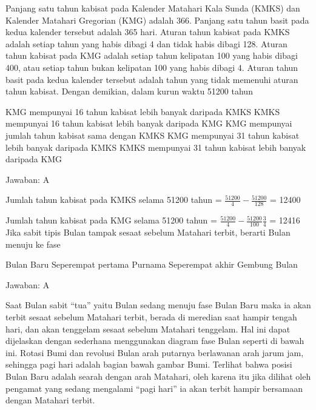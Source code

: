 \documentclass[11pt,fleqn]{exam}
\begin{document}
\begin{questions}
\question Panjang satu tahun kabisat pada Kalender Matahari Kala Sunda (KMKS) dan Kalender Matahari Gregorian (KMG) adalah 366. Panjang satu tahun basit pada kedua kalender tersebut adalah 365 hari. Aturan tahun kabisat pada KMKS adalah setiap tahun yang habis dibagi 4 dan tidak habis dibagi 128. Aturan tahun kabisat pada KMG adalah setiap tahun kelipatan 100 yang habis dibagi 400, atau setiap tahun bukan kelipatan 100 yang habis dibagi 4. Aturan tahun basit pada kedua kalender tersebut adalah tahun yang tidak memenuhi aturan tahun kabisat. Dengan demikian, dalam kurun waktu 51200 tahun
\begin{choices}
\choice KMG mempunyai 16 tahun kabisat lebih banyak daripada KMKS
\choice KMKS mempunyai 16 tahun kabisat lebih banyak daripada KMG
\choice KMG mempunyai jumlah tahun kabisat sama dengan KMKS
\choice KMG mempunyai 31 tahun kabisat lebih banyak daripada KMKS
\choice KMKS mempunyai 31 tahun kabisat lebih banyak daripada KMG
\end{choices}

Jawaban: A

Jumlah tahun kabisat pada KMKS selama 51200 tahun = $\frac{51200}{4}-\frac{51200}{128}$ = 12400

Jumlah tahun kabisat pada KMG selama 51200 tahun = $\frac{51200}{4}-\frac{51200}{100}\frac{3}{4}$ = 12416\\


\question Jika sabit tipis Bulan tampak sesaat sebelum Matahari terbit, berarti Bulan menuju ke fase
\begin{choices}
\choice Bulan Baru
\choice Seperempat pertama
\choice Purnama
\choice Seperempat akhir
\choice Gembung Bulan
\end{choices}

Jawaban: A

Saat Bulan sabit ``tua'' yaitu Bulan sedang menuju fase Bulan Baru maka ia akan terbit sesaat sebelum Matahari terbit, berada di meredian saat hampir tengah hari, dan akan tenggelam sesaat sebelum Matahari tenggelam. Hal ini dapat dijelaskan dengan sederhana menggunakan diagram fase Bulan seperti di bawah ini. Rotasi Bumi dan revolusi Bulan arah putarnya berlawanan arah jarum jam, sehingga pagi hari adalah bagian bawah gambar Bumi. Terlihat bahwa posisi Bulan Baru adalah searah dengan arah Matahari, oleh karena itu jika dilihat oleh pengamat yang sedang mengalami ``pagi hari'' ia akan terbit hampir bersamaan dengan Matahari terbit.


\end{questions}
\end{document}
